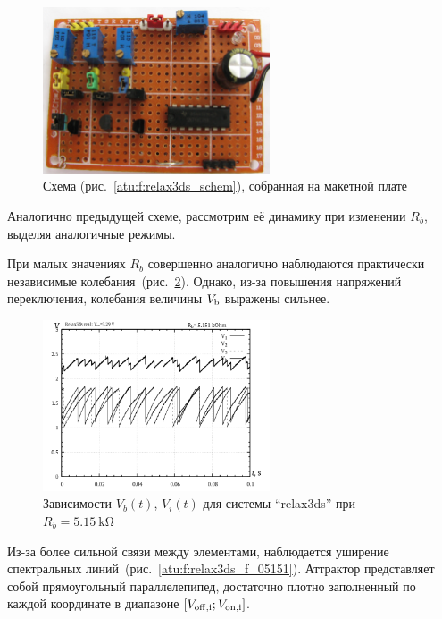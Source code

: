 \begin{figure}[htb!]
  \centerline{\includegraphics[width=0.6\textwidth]{p/relax3ds_board.jpg} }
  \caption{Схема (рис.~\ref{atu:f:relax3ds_schem}), собранная на макетной плате}
  \label{atu:f:relax3ds_board}
\end{figure}

Аналогично предыдущей схеме, рассмотрим её динамику при
изменении $R_b$, выделяя аналогичные режимы.


При малых
значениях $R_b$
совершенно аналогично наблюдаются практически независимые
колебания~(рис.~\ref{atu:f:relax3ds_t_05151}).
Однако, из-за повышения напряжений переключения,
колебания величины $V_\mathrm{b}$
выражены сильнее.

\begin{figure}[htb!]
  \centerline{\includegraphics[width=0.6\textwidth]{p/relax3ds_t_005151.png} }
  \caption{Зависимости $V_b(t)$, $V_i(t)$ для системы ``relax3ds'' при $R_b=\SI{5.15}{\kilo\ohm}$ }
  \label{atu:f:relax3ds_t_05151}
\end{figure}


Из-за более сильной связи между элементами,
наблюдается уширение спектральных линий~(рис.~\ref{atu:f:relax3ds_f_05151}).
Аттрактор представляет собой прямоугольный параллелепипед, достаточно плотно заполненный по каждой координате в
диапазоне $[ V_\mathrm{off,i} ; V_\mathrm{on,i} ] $.


